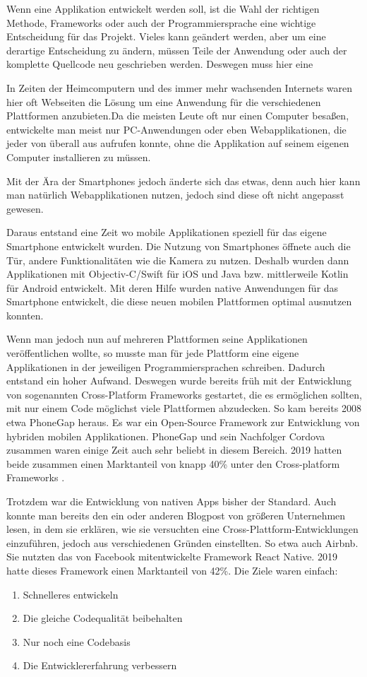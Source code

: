 Wenn eine Applikation entwickelt werden soll, ist die Wahl der richtigen Methode, Frameworks oder auch der Programmiersprache eine wichtige Entscheidung für das Projekt. Vieles kann geändert werden, aber um eine derartige Entscheidung zu ändern, müssen Teile der Anwendung oder auch der komplette Quellcode neu geschrieben werden. Deswegen muss hier eine 

In Zeiten der Heimcomputern und des immer mehr wachsenden Internets waren hier oft Webseiten die Lösung um eine Anwendung für die verschiedenen Plattformen anzubieten.Da die meisten Leute oft nur einen Computer besaßen, entwickelte man meist nur PC-Anwendungen oder eben Webapplikationen, die jeder von überall aus aufrufen konnte, ohne die Applikation auf seinem eigenen Computer installieren zu müssen.

Mit der Ära der Smartphones jedoch änderte sich das etwas, denn auch hier kann man natürlich Webapplikationen nutzen, jedoch sind diese oft nicht angepasst gewesen.

Daraus entstand eine Zeit wo mobile Applikationen speziell für das eigene Smartphone entwickelt wurden. Die Nutzung von Smartphones öffnete auch die Tür, andere Funktionalitäten wie die Kamera zu nutzen. Deshalb wurden dann Applikationen mit Objectiv-C/Swift für iOS und Java bzw. mittlerweile Kotlin für Android entwickelt. Mit deren Hilfe wurden native Anwendungen für das Smartphone entwickelt, die diese neuen mobilen Plattformen optimal ausnutzen konnten.

Wenn man jedoch nun auf mehreren Plattformen seine Applikationen veröffentlichen wollte, so musste man für jede Plattform eine eigene Applikationen in der jeweiligen Programmiersprachen schreiben. Dadurch entstand ein hoher Aufwand. Deswegen wurde bereits früh mit der Entwicklung von sogenannten Cross-Platform Frameworks gestartet, die es ermöglichen sollten, mit nur einem Code möglichst viele Plattformen abzudecken. So kam bereits 2008 etwa PhoneGap heraus. Es war ein Open-Source Framework zur Entwicklung von hybriden mobilen Applikationen. PhoneGap und sein Nachfolger Cordova zusammen waren einige Zeit auch sehr beliebt in diesem Bereich. 2019 hatten beide zusammen einen Marktanteil von knapp 40\% unter den Cross-platform Frameworks \cite{statist_CP_Framework}.

Trotzdem war die Entwicklung von nativen Apps bisher der Standard. Auch konnte man bereits den ein oder anderen Blogpost von größeren Unternehmen lesen, in dem sie erklären, wie sie versuchten eine  Cross-Plattform-Entwicklungen einzuführen, jedoch aus verschiedenen Gründen einstellten. So etwa auch Airbnb. Sie nutzten das von Facebook mitentwickelte Framework React Native. 2019 hatte dieses Framework einen Marktanteil von 42\%. 
\break
Die Ziele waren einfach:
\begin{enumerate}
    \item Schnelleres entwickeln
    \item Die gleiche Codequalität beibehalten
    \item Nur noch eine Codebasis
    \item Die Entwicklererfahrung verbessern\cite{Airbnb_react_goals}
\end{enumerate}

